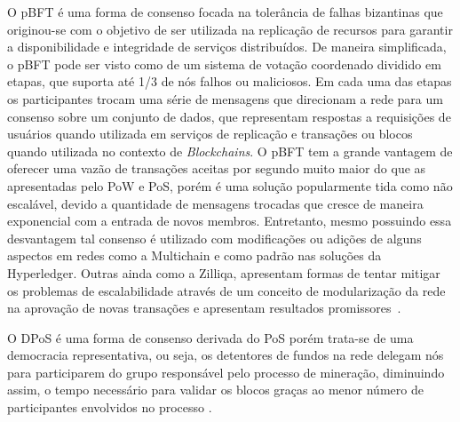 %
O \ac{pBFT} é uma forma de consenso focada na tolerância de falhas bizantinas que originou-se com o objetivo de ser utilizada na replicação de recursos para garantir a disponibilidade e integridade de serviços distribuídos. De maneira simplificada, o \ac{pBFT} pode ser visto como de um sistema de votação coordenado dividido em etapas, que suporta até 1/3 de nós falhos ou maliciosos. Em cada uma das etapas os participantes trocam uma série de mensagens que direcionam a rede para um consenso sobre um conjunto de dados, que representam respostas a requisições de usuários quando utilizada em serviços de replicação e transações ou blocos quando utilizada no contexto de \textit{Blockchains}\cite{blockchain:pbft}. O \ac{pBFT} tem a grande vantagem de oferecer uma vazão de transações aceitas por segundo muito maior do que as apresentadas pelo \ac{PoW} e \ac{PoS}, porém é uma solução popularmente tida como não escalável, devido a quantidade de mensagens trocadas que cresce de maneira exponencial com a entrada de novos membros. Entretanto, mesmo possuindo essa desvantagem tal consenso é utilizado com modificações ou adições de alguns aspectos em redes como a Multichain\cite{blockchain:multichain_whitepaper} e como padrão nas soluções da Hyperledger\cite{blockchain:hyperledger}. Outras ainda como a Zilliqa, apresentam formas de tentar mitigar os problemas de escalabilidade através de um conceito de modularização da rede na aprovação de novas transações e apresentam resultados promissores~\cite{blockchain:zilliqa_whitepaper}.

%
O \ac{DPoS} é uma forma de consenso derivada do \ac{PoS} porém trata-se de uma democracia representativa, ou seja, os detentores de fundos na rede delegam nós para participarem do grupo responsável pelo processo de mineração, diminuindo assim, o tempo necessário para validar os blocos graças ao menor número de participantes envolvidos no processo \cite{blockchain:survey}. 

